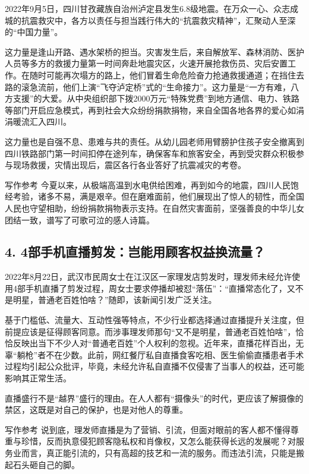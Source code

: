 2022年9月5日，四川甘孜藏族自治州泸定县发生6.8级地震。在万众一心、众志成城的抗震救灾中，各方以责任与担当践行伟大的“抗震救灾精神”，汇聚动人至深的“中国力量”。

这力量是逢山开路、遇水架桥的担当。灾害发生后，来自解放军、森林消防、医护人员等多方的救援力量第一时间奔赴地震灾区，火速开展抢救伤员、灾后安置工作。在随时可能再次塌方的路上，他们冒着生命危险奋力抢通救援通道；在挡住去路的滚急流前，他们上演“飞夺泸定桥”式的“生命接力”。这力量是“一方有难，八方支援”的大爱。从中央组织部下拨2000万元“特殊党费”到地方通信、电力、铁路等部门开启应急模式，再到社会大众纷纷捐款捐物，来自全国各地各界的爱心如涓涓暖流汇入四川。

这力量也是自强不息、患难与共的责任。从幼儿园老师用臂膀护住孩子安全撤离到四川铁路部门第一时间扣停在途列车，确保客车和旅客安全，再到受灾群众积极参与现场救援，灾情出现后，震区各行各业答好了抗震减灾的考卷。

\begin{quoteBox}{写作参考}
今夏以来，从极端高温到水电供给困难，再到如今的地震，四川人民饱经考验，诸多不易，满是艰辛。但在磨难面前，他们展现出了惊人的韧性，而全国人民也守望相助，纷纷捐款捐物表示支持。在自然灾害面前，坚强善良的中华儿女团结一致，谱写了可歌可泣的感人诗篇。
\end{quoteBox}

\subsection*{4. 4部手机直播剪发：岂能用顾客权益换流量？}

2022年8月22日，武汉市民周女士在江汉区一家理发店剪发时，理发师未经允许使用4部手机直播了剪发过程，周女士要求停播却被怼“落伍”：“直播常态化了，又不是明星，普通老百姓怕啥？”随即，该新闻引发广泛关注。

基于门槛低、流量大、互动性强等特点，不少行业都选择通过直播提升关注度，但前提应该是征得顾客同意。而涉事理发师那句“又不是明星，普通老百姓怕啥”，恰恰反映出当下不少人对“普通老百姓”个人权利的忽视。近年来，直播花样百出，无辜“躺枪”者不在少数。此前，网红餐厅私自直播食客吃相、医生偷偷直播患者手术过程均引起公众批评，毕竟，未经允许私自直播不仅侵害了当事人的权益，还可能影响其正常生活。

直播盛行不是“越界”盛行的理由。在人人都有“摄像头”的时代，更应该了解摄像的禁区，这既是对自己的保护，也是对他人的尊重。

\begin{quoteBox}{写作参考}
说到底，理发师直播是为了营销、引流，但面对眼前的客人都不懂得尊重与珍惜，反而执意侵犯顾客隐私权和肖像权，又怎么能获得长远的发展呢？对服务业而言，真正能引流的，只有高超的技艺和一流的服务。而违法引流，只能是搬起石头砸自己的脚。
\end{quoteBox}

